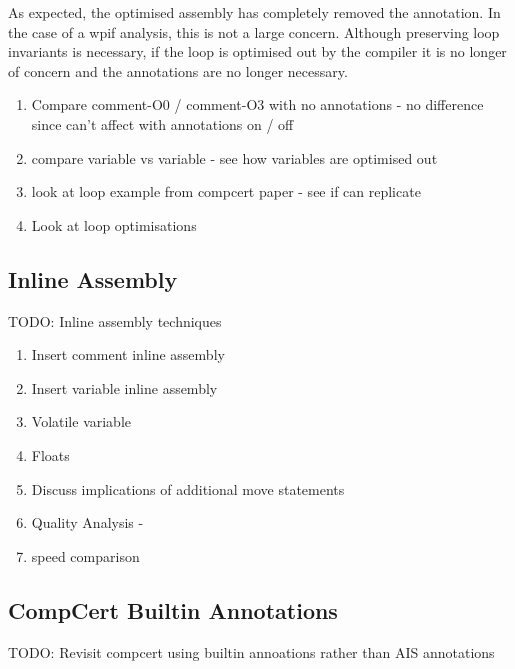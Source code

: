 

As expected, the optimised assembly has completely removed the annotation. In the case of a wpif analysis, this is not a large concern. Although preserving loop invariants is necessary, if the loop is optimised out by the compiler it is no longer of concern and the annotations are no longer necessary.

\begin{enumerate}
    \item Compare comment-O0 / comment-O3 with no annotations - no difference since can't affect with annotations on / off
    \item compare variable vs variable - see how variables are optimised out
    \item look at loop example from compcert paper - see if can replicate
    \item Look at loop optimisations
\end{enumerate}







\subsection{Inline Assembly}
\label{subsec:inlineAssembly}
TODO: Inline assembly techniques

\begin{enumerate}
    \item Insert comment inline assembly
    \item Insert variable inline assembly
    \item Volatile variable
    \item Floats
    \item Discuss implications of additional move statements
    \item Quality Analysis -
    \item speed comparison
\end{enumerate}

\subsection{CompCert Builtin Annotations}
TODO: Revisit compcert using builtin annoations rather than AIS annotations

